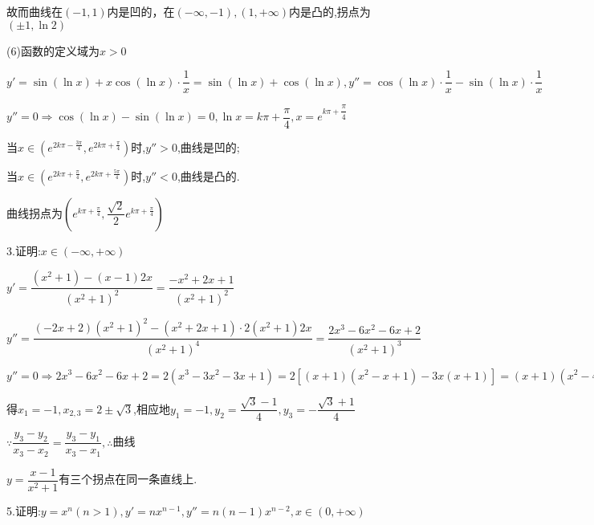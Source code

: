 故而曲线在$\left( { - 1,1} \right)$内是凹的，在$\left( { - \infty , - 1} \right),\left( {1, + \infty } \right)$内是凸的,拐点为$\left( { \pm 1,\ln 2} \right)$

(6)函数的定义域为$x > 0$

$y' = \sin \left( {\ln x} \right) + x\cos \left( {\ln x} \right) \cdot \dfrac{1}{x} = \sin \left( {\ln x} \right) + \cos \left( {\ln x} \right),y'' = \cos \left( {\ln x} \right) \cdot \dfrac{1}{x} - \sin \left( {\ln x} \right) \cdot \dfrac{1}{x}$

$y'' = 0 \Rightarrow \cos \left( {\ln x} \right) - \sin \left( {\ln x} \right) = 0,\ln x = k\pi  + \dfrac{\pi }{4},x = {e^{k\pi  + \dfrac{\pi }{4}}}$

当$x \in \left( {{e^{2k\pi  - \frac{{3\pi }}{4}}},{e^{2k\pi  + \frac{\pi }{4}}}} \right)$时,$y'' > 0$,曲线是凹的;

当$x \in \left( {{e^{2k\pi  + \frac{\pi }{4}}},{e^{2k\pi  + \frac{{5\pi }}{4}}}} \right)$时,$y'' < 0$,曲线是凸的.

曲线拐点为$\left( {{e^{k\pi  + \frac{\pi }{4}}},\dfrac{{\sqrt 2 }}{2}{e^{k\pi  + \frac{\pi }{4}}}} \right)$

3.证明:$x \in \left( { - \infty , + \infty } \right)$

$y' = \dfrac{{\left( {{x^2} + 1} \right) - \left( {x - 1} \right)2x}}{{{{\left( {{x^2} + 1} \right)}^2}}} = \dfrac{{ - {x^2} + 2x + 1}}{{{{\left( {{x^2} + 1} \right)}^2}}}$

$y'' = \dfrac{{\left( { - 2x + 2} \right){{\left( {{x^2} + 1} \right)}^2} - \left( {{x^2} + 2x + 1} \right) \cdot 2\left( {{x^2} + 1} \right)2x}}{{{{\left( {{x^2} + 1} \right)}^4}}} = \dfrac{{2{x^3} - 6{x^2} - 6x + 2}}{{{{\left( {{x^2} + 1} \right)}^3}}}$

$y'' = 0 \Rightarrow 2{x^3} - 6{x^2} - 6x + 2 = 2\left( {{x^3} - 3{x^2} - 3x + 1} \right) = 2\left[ {\left( {x + 1} \right)\left( {{x^2} - x + 1} \right) - 3x\left( {x + 1} \right)} \right] = \left( {x + 1} \right)\left( {{x^2} - 4x + 1} \right) = 0$

得${x_1} =  - 1,{x_{2,3}} = 2 \pm \sqrt 3 $,相应地${y_1} =  - 1,{y_2} = \dfrac{{\sqrt 3  - 1}}{4},{y_3} =  - \dfrac{{\sqrt 3  + 1}}{4}$

$\because \dfrac{{{y_3} - {y_2}}}{{{x_3} - {x_2}}} = \dfrac{{{y_3} - {y_1}}}{{{x_3} - {x_1}}},\therefore $曲线

$y = \dfrac{{x - 1}}{{{x^2} + 1}}$有三个拐点在同一条直线上.

5.证明:$y = {x^n}\left( {n > 1} \right),y' = n{x^{n - 1}},y'' = n\left( {n - 1} \right){x^{n - 2}},x \in \left( {0, + \infty } \right)$

